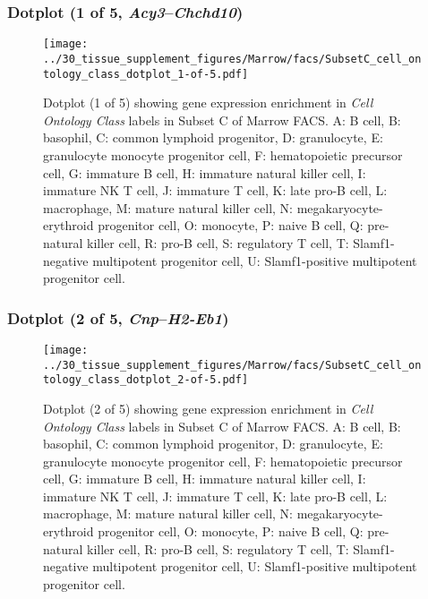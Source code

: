 \subsubsection{Dotplot (1 of 5, \emph{Acy3}--\emph{Chchd10})}
\begin{figure}[h]
\centering
\texttt{[image: ../30\_tissue\_supplement\_figures/Marrow/facs/SubsetC\_cell\_ontology\_class\_dotplot\_1-of-5.pdf]}

\caption{ Dotplot (1 of 5)  showing gene expression enrichment in \emph{Cell Ontology Class} labels in Subset C of Marrow FACS. A: B cell, B: basophil, C: common lymphoid progenitor, D: granulocyte, E: granulocyte monocyte progenitor cell, F: hematopoietic precursor cell, G: immature B cell, H: immature natural killer cell, I: immature NK T cell, J: immature T cell, K: late pro-B cell, L: macrophage, M: mature natural killer cell, N: megakaryocyte-erythroid progenitor cell, O: monocyte, P: naive B cell, Q: pre-natural killer cell, R: pro-B cell, S: regulatory T cell, T: Slamf1-negative multipotent progenitor cell, U: Slamf1-positive multipotent progenitor cell.}
\end{figure}


\clearpage

\subsubsection{Dotplot (2 of 5, \emph{Cnp}--\emph{H2-Eb1})}
\begin{figure}[h]
\centering
\texttt{[image: ../30\_tissue\_supplement\_figures/Marrow/facs/SubsetC\_cell\_ontology\_class\_dotplot\_2-of-5.pdf]}

\caption{ Dotplot (2 of 5)  showing gene expression enrichment in \emph{Cell Ontology Class} labels in Subset C of Marrow FACS. A: B cell, B: basophil, C: common lymphoid progenitor, D: granulocyte, E: granulocyte monocyte progenitor cell, F: hematopoietic precursor cell, G: immature B cell, H: immature natural killer cell, I: immature NK T cell, J: immature T cell, K: late pro-B cell, L: macrophage, M: mature natural killer cell, N: megakaryocyte-erythroid progenitor cell, O: monocyte, P: naive B cell, Q: pre-natural killer cell, R: pro-B cell, S: regulatory T cell, T: Slamf1-negative multipotent progenitor cell, U: Slamf1-positive multipotent progenitor cell.}
\end{figure}


\clearpage

